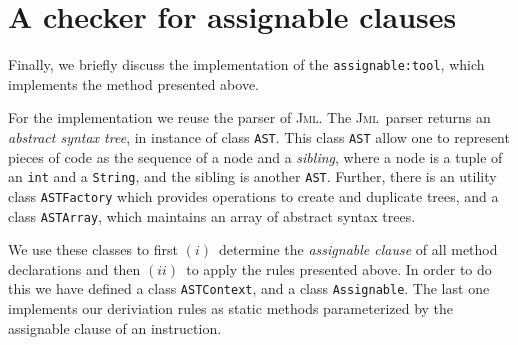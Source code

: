 \documentclass[a4paper]{llncs}
\newcommand{\jml}{\textsc{Jml}}
\newcommand{\modtool}{\texttt{assignable:tool}}
\begin{document}
\section{A checker for assignable clauses}
\label{sec-che-for-ass-cla}
Finally, we briefly discuss the implementation of the \modtool, which
implements the method presented above.

For the implementation we reuse the parser of \jml.
The \jml\ parser returns an
\emph{abstract syntax tree}, in instance of class \texttt{AST}.
This class \texttt{AST} allow one to represent pieces of code as the
sequence of a node and a \emph{sibling}, where a node is a tuple of an
\texttt{int} and a \texttt{String}, and the sibling is another
\texttt{AST}.
Further, there is an utility class \texttt{ASTFactory} which
provides operations to create and duplicate trees, and a class
\texttt{ASTArray}, which maintains an array of abstract syntax trees.


We use these classes to first $(i)$\ determine the \emph{assignable
clause} of all method declarations and then $(ii)$\ to apply the rules
presented above. In order to do this we have defined a class
\texttt{ASTContext}, and a class \texttt{Assignable}. 
The last one implements our deriviation rules as static methods
parameterized by the assignable clause of an instruction.





\end{document}
